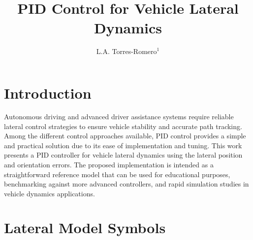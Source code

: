 \documentclass[12pt,a4paper]{cibb}
\title{\Large $\ $\\ \bf PID Control for Vehicle Lateral Dynamics}
\author{\large L.A. Torres-Romero$^1$}
\begin{document}
\renewcommand{\thefootnote}{}


\thispagestyle{myheadings}
\pagestyle{myheadings}


\section{Introduction} \label{sec:Introduction}

Autonomous driving and advanced driver assistance systems require reliable lateral control strategies to ensure vehicle stability and accurate path tracking. Among the different control approaches available, PID control provides a simple and practical solution due to its ease of implementation and tuning. This work presents a PID controller for vehicle lateral dynamics using the lateral position and orientation errors. The proposed implementation is intended as a straightforward reference model that can be used for educational purposes, benchmarking against more advanced controllers, and rapid simulation studies in vehicle dynamics applications.

\section{Lateral Model Symbols} \label{sec:Symbols}
\end{document}
